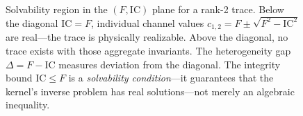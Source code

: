 \documentclass[
  aps,
  prd,
  twocolumn,
  superscriptaddress,
  nofootinbib,
  floatfix
]{revtex4-2}
\newcommand{\IC}{\mathrm{IC}}
\begin{document}
\begin{figure}[t!]
\caption{Solvability region in the $(F, \IC)$
plane for a rank-2 trace.  Below the
diagonal $\IC = F$, individual channel values
$c_{1,2} = F \pm \sqrt{F^2 - \IC^2}$ are real---the trace
is physically realizable.  Above the diagonal, no trace
exists with those aggregate invariants.  The heterogeneity
gap $\Delta = F - \IC$ measures deviation from the diagonal.
The integrity bound $\IC \leq F$ is a \emph{solvability
condition}---it guarantees that the kernel's inverse problem
has real solutions---not merely an algebraic inequality.}
\label{fig:solvability}
\end{figure}

\clearpage

\end{document}
